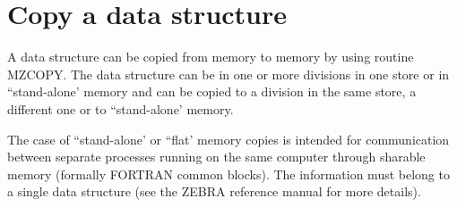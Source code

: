 \section{Copy a data structure}
\par A data structure can be copied from memory to memory by using
routine MZCOPY. The data structure can be in one or more divisions
in one store or in ``stand-alone' memory and can be copied to a division
in the same store, a different one or to ``stand-alone' memory.
\par The case of ``stand-alone' or ``flat'
memory copies is intended for communication
between separate processes running on the same computer through sharable
memory (formally FORTRAN common blocks). The information must belong to
a single data structure
(see the ZEBRA reference manual for more details).
